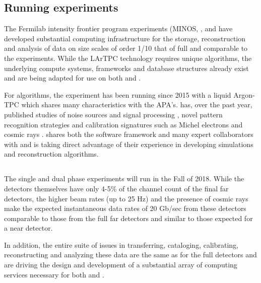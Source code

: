 \subsection{Running experiments}\label{sw:IF-input}

The Fermilab intensity frontier program experiments (MINOS\cite{minos},  \cite{minerva}, \cite{microboone} and  \cite{nova} have developed substantial computing infrastructure for the storage, reconstruction and analysis of data on size scales of order 1/10 that of full   and comparable to the  experiments. While the LArTPC technology requires unique algorithms, the underlying compute systems, frameworks and database structures already exist and are being adapted for use on both  and  .

For algorithms, the  \cite{Acciarri:2016smi} experiment has been running since 2015 with a liquid Argon-TPC which shares many characteristics with the   APA's.     has, over the past year, published studies of noise sources and signal processing \cite{Acciarri:2017sde,Adams:2018dra}, novel pattern recognition strategies \cite{Acciarri:2016ryt,Acciarri:2017hat} and calibration signatures such as Michel electrons and cosmic rays \cite{Acciarri:2017sjy,Acciarri:2017sde}.    shares both the \larsoft software framework and many expert collaborators with   and is taking direct advantage of their experience in developing simulations and reconstruction algorithms.


\subsection{}\label{sw:PD-planning}

The  single and dual phase experiments will run in the Fall of 2018.  While the detectors themselves have only 4-5\% of the channel count  of the final far detectors, the higher beam rates (up to 25 Hz) and the presence of cosmic rays make the expected instantaneous data rates of 20 Gb/sec from these detectors comparable to those from the full far detectors and similar to those expected for a near detector. 

In addition, the entire suite of issues in transferring, cataloging, calibrating, reconstructing and analyzing these data are the same as for the full detectors and are driving the design and development of a substantial array of computing services necessary for both  and  .

